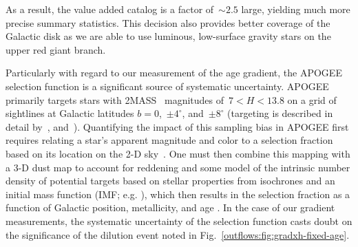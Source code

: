 As a result, the value added catalog is a factor of~$\sim$$2.5$ large, yielding
much more precise summary statistics.
This decision also provides better coverage of the Galactic disk as we are able
to use luminous, low-surface gravity stars on the upper red giant branch.
\par
Particularly with regard to our measurement of the age gradient, the APOGEE
selection function is a significant source of systematic uncertainty.
APOGEE primarily targets stars with 2MASS~\citep{Skrutskie2006} magnitudes
of~$7 < H < 13.8$ on a grid of sightlines at Galactic latitudes
$b = 0$,~$\pm 4^\circ$, and~$\pm 8^\circ$ (targeting is described in detail
by~\citealt{Zasowski2013, Zasowski2017, Beaton2021}, and~\citealt{Santana2021}).
Quantifying the impact of this sampling bias in APOGEE first requires relating
a star's apparent magnitude and color to a selection fraction based on its
location on the 2-D sky~\citep{Bovy2016c, Mackereth2017, Lian2022}.
One must then combine this mapping with a 3-D dust map to account for reddening
and some model of the intrinsic number density of potential targets based on
stellar properties from isochrones and an initial mass function (IMF; e.g.
\citealt{Kroupa2001, Chabrier2003}), which then results in the selection
fraction as a function of Galactic position, metallicity, and age
\citep[see also][]{Mackereth2020}.
In the case of our gradient measurements, the systematic uncertainty of the
selection function casts doubt on the significance of the dilution event
noted in Fig.~\ref{outflows:fig:gradxh-fixed-age}.






